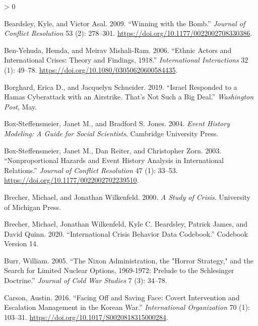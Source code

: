 \documentclass[
]{article}
\newlength{\cslhangindent}
\newenvironment{CSLReferences}[2] %
 {%
  \setlength{\parindent}{0pt}
  \ifodd #1 \everypar{\setlength{\hangindent}{\cslhangindent}}\ignorespaces\fi
  \ifnum #2 > 0
  \setlength{\parskip}{#2\baselineskip}
  \fi
 }%
 {}
\begin{document}
\begin{CSLReferences}{1}{0}
\leavevmode\hypertarget{ref-beardsley_winningbomb_2009}{}%
Beardsley, Kyle, and Victor Asal. 2009. {``Winning with the {Bomb}.''} \emph{Journal of Conflict Resolution} 53 (2): 278--301. \url{https://doi.org/10.1177/0022002708330386}.

\leavevmode\hypertarget{ref-ben-yehuda_ethnicactorsinternational_2006}{}%
Ben-Yehuda, Hemda, and Meirav Mishali-Ram. 2006. {``Ethnic {Actors} and {International Crises}: {Theory} and {Findings}, 1918{}.''} \emph{International Interactions} 32 (1): 49--78. \url{https://doi.org/10.1080/03050620600584435}.

\leavevmode\hypertarget{ref-borghard_israelrespondedhamas_2019}{}%
Borghard, Erica D., and Jacquelyn Schneider. 2019. {``Israel Responded to a {Hamas} Cyberattack with an Airstrike. {That}'s Not Such a Big Deal.''} \emph{Washington Post}, May.

\leavevmode\hypertarget{ref-box-steffensmeier_eventhistorymodeling_2004}{}%
Box-Steffensmeier, Janet M., and Bradford S. Jones. 2004. \emph{Event {History Modeling}: {A Guide} for {Social Scientists}}. {Cambridge University Press}.

\leavevmode\hypertarget{ref-box-steffensmeier_nonproportionalhazardsevent_2003}{}%
Box-Steffensmeier, Janet M., Dan Reiter, and Christopher Zorn. 2003. {``Nonproportional {Hazards} and {Event History Analysis} in {International Relations}.''} \emph{Journal of Conflict Resolution} 47 (1): 33--53. \url{https://doi.org/10.1177/0022002702239510}.

\leavevmode\hypertarget{ref-brecher_studycrisis_2000}{}%
Brecher, Michael, and Jonathan Wilkenfeld. 2000. \emph{A {Study} of {Crisis}}. {University of Michigan Press}.

\leavevmode\hypertarget{ref-brecher_internationalcrisisbehavior_2020}{}%
Brecher, Michael, Jonathan Wilkenfeld, Kyle C. Beardsley, Patrick James, and David Quinn. 2020. {``International {Crisis Behavior Data Codebook}.''} Codebook Version 14.

\leavevmode\hypertarget{ref-burr_nixonadministrationhorror_2005}{}%
Burr, William. 2005. {``The {Nixon Administration}, the "{Horror Strategy}," and the {Search} for {Limited Nuclear Options}, 1969-1972: {Prelude} to the {Schlesinger Doctrine}.''} \emph{Journal of Cold War Studies} 7 (3): 34--78.

\leavevmode\hypertarget{ref-carson_facingsavingface_2016}{}%
Carson, Austin. 2016. {``Facing {Off} and {Saving Face}: {Covert Intervention} and {Escalation Management} in the {Korean War}.''} \emph{International Organization} 70 (1): 103--31. \url{https://doi.org/10.1017/S0020818315000284}.


\end{CSLReferences}
\end{document}

